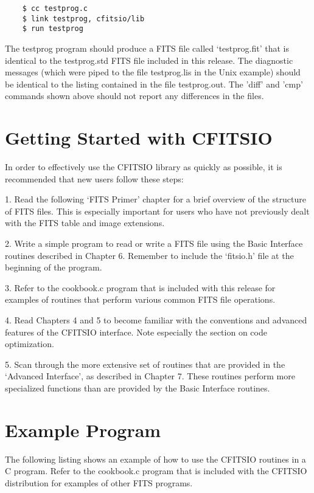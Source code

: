 \begin{verbatim}
    $ cc testprog.c
    $ link testprog, cfitsio/lib
    $ run testprog
\end{verbatim}
The testprog program should produce a FITS file called `testprog.fit'
that is identical to the testprog.std FITS file included in this
release.  The diagnostic messages (which were piped to the file
testprog.lis in the Unix example) should be identical to the listing
contained in the file testprog.out.  The 'diff' and 'cmp' commands
shown above should not report any differences in the files.


\section{Getting Started with CFITSIO}

In order to effectively use the CFITSIO library as quickly as possible,
it is recommended that new users follow these steps:

1.  Read the following `FITS Primer' chapter for a brief
overview of the structure of FITS files.  This is especially important
for users who have not previously dealt with the FITS table and image
extensions.

2.  Write a simple program to read or write a FITS file using the Basic
Interface routines described in Chapter 6.  Remember to include the
`fitsio.h' file at the beginning of the program.

3.  Refer to the cookbook.c program that is included with this release
for examples of routines that perform various common FITS file
operations.

4. Read Chapters 4 and 5 to become familiar with the conventions and
advanced features of the CFITSIO interface.  Note especially the
section on code optimization.

5.  Scan through the more extensive set of routines that are provided
in the `Advanced Interface', as described in Chapter 7.  These routines
perform more specialized functions than are provided by the Basic
Interface routines.


\section{Example Program}

The following listing shows an example of how to use the CFITSIO
routines in a C program.  Refer to the cookbook.c program that
is included with the CFITSIO distribution for examples of other
FITS programs.


